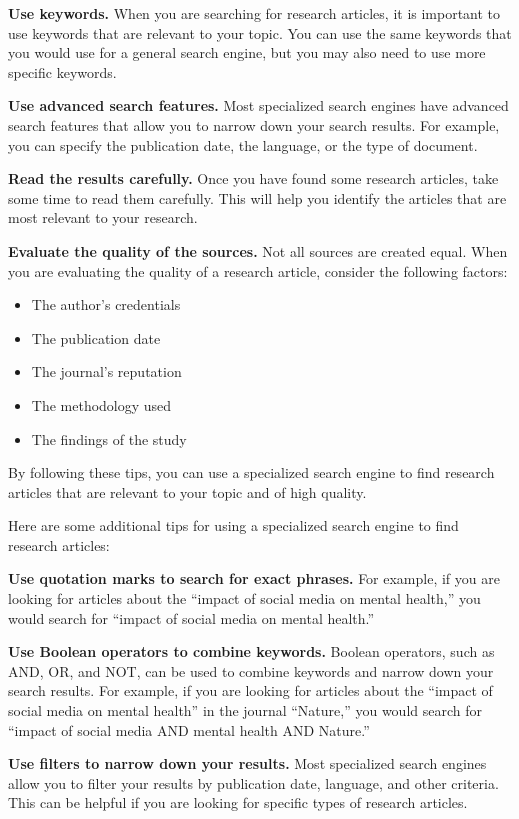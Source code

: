 \documentclass[
]{book}
\begin{document}
\textbf{Use keywords.} When you are searching for research articles, it is important to use keywords that are relevant to your topic. You can use the same keywords that you would use for a general search engine, but you may also need to use more specific keywords.

\textbf{Use advanced search features.} Most specialized search engines have advanced search features that allow you to narrow down your search results. For example, you can specify the publication date, the language, or the type of document.

\textbf{Read the results carefully.} Once you have found some research articles, take some time to read them carefully. This will help you identify the articles that are most relevant to your research.

\textbf{Evaluate the quality of the sources.} Not all sources are created equal. When you are evaluating the quality of a research article, consider the following factors:

\begin{itemize}
\item
  The author's credentials
\item
  The publication date
\item
  The journal's reputation
\item
  The methodology used
\item
  The findings of the study
\end{itemize}

By following these tips, you can use a specialized search engine to find research articles that are relevant to your topic and of high quality.

Here are some additional tips for using a specialized search engine to find research articles:

\textbf{Use quotation marks to search for exact phrases.} For example, if you are looking for articles about the ``impact of social media on mental health,'' you would search for ``impact of social media on mental health.''

\textbf{Use Boolean operators to combine keywords.} Boolean operators, such as AND, OR, and NOT, can be used to combine keywords and narrow down your search results. For example, if you are looking for articles about the ``impact of social media on mental health'' in the journal ``Nature,'' you would search for ``impact of social media AND mental health AND Nature.''

\textbf{Use filters to narrow down your results.} Most specialized search engines allow you to filter your results by publication date, language, and other criteria. This can be helpful if you are looking for specific types of research articles.
\end{document}
